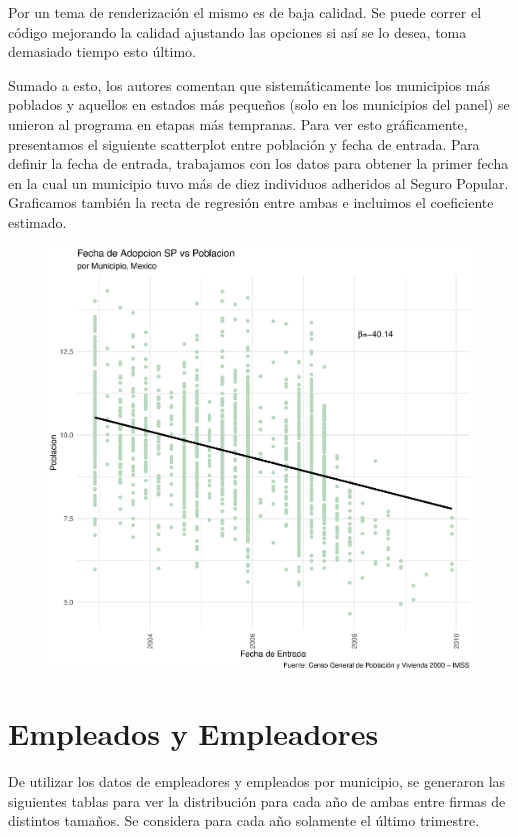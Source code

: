 \documentclass[9pt]{article}
\begin{document}
Por un tema de renderizaci\'on el mismo es de baja calidad. Se puede correr el c\'odigo mejorando la calidad ajustando las opciones si as\'i se lo desea, toma demasiado tiempo esto \'ultimo. 

Sumado a esto, los autores comentan que sistemáticamente los municipios más poblados y aquellos en estados más pequeños (solo en los municipios del panel) se unieron al programa en etapas más tempranas. Para ver esto gr\'aficamente, presentamos el siguiente scatterplot entre poblaci\'on y fecha de entrada. Para definir la fecha de entrada, trabajamos con los datos para obtener la primer fecha en la cual un municipio tuvo m\'as de diez individuos adheridos al Seguro Popular. Graficamos tambi\'en la recta de regresi\'on entre ambas e incluimos el coeficiente estimado. 

 \begin{figure}[H]
     \centering
     \includegraphics[width=\textwidth]{figs/Correlacion Cami.eps}
 \end{figure}
 \section*{Empleados y Empleadores}
 De utilizar los datos de empleadores y empleados por municipio, se generaron las siguientes tablas para ver la distribuci\'on para cada a\~no de ambas entre firmas de distintos tama\~nos. Se considera para cada a\~no solamente el \'ultimo trimestre. 
 
\end{document}

